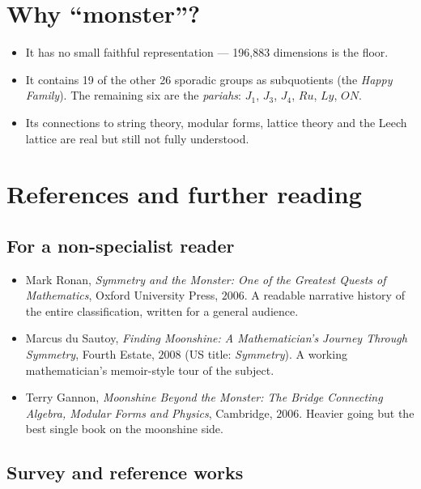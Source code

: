 \documentclass[11pt]{article}
\begin{document}
\section*{Why ``monster''?}

\begin{itemize}[leftmargin=*, itemsep=2pt]
  \item It has no small faithful representation --- 196{,}883 dimensions
        is the floor.
  \item It contains 19 of the other 26 sporadic groups as subquotients
        (the \emph{Happy Family}). The remaining six are the
        \emph{pariahs}: $J_1$, $J_3$, $J_4$, $\mathit{Ru}$,
        $\mathit{Ly}$, $\mathit{ON}$.
  \item Its connections to string theory, modular forms, lattice theory
        and the Leech lattice are real but still not fully understood.
\end{itemize}

\section*{References and further reading}

\subsection*{For a non-specialist reader}

\begin{itemize}[leftmargin=*, itemsep=2pt]
  \item Mark Ronan, \emph{Symmetry and the Monster: One of the
        Greatest Quests of Mathematics}, Oxford University Press,
        $2006$. A readable narrative history of the entire
        classification, written for a general audience.
  \item Marcus du Sautoy, \emph{Finding Moonshine: A Mathematician's
        Journey Through Symmetry}, Fourth Estate, $2008$ (US title:
        \emph{Symmetry}). A working mathematician's memoir-style
        tour of the subject.
  \item Terry Gannon, \emph{Moonshine Beyond the Monster: The Bridge
        Connecting Algebra, Modular Forms and Physics}, Cambridge,
        $2006$. Heavier going but the best single book on the
        moonshine side.
\end{itemize}

\subsection*{Survey and reference works}
\end{document}
